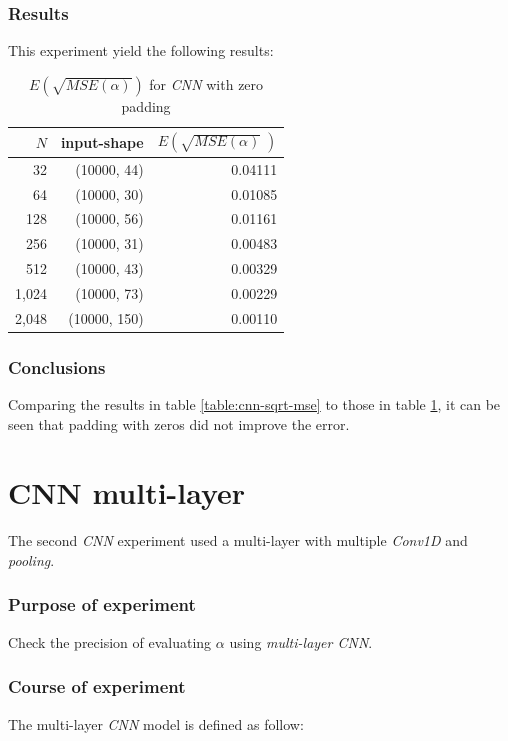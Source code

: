 \documentclass[a4paper, 12pt]{report}
\begin{document}
\subsubsection{Results}
This experiment yield the following results:
\begin{table}[h!]
    \centering
    \begin{tabular}{r r r} 
        $N$ & input-shape & $E\left(\sqrt{MSE(\alpha)}\;\right)$ \\
        \hline
        32 & (10000, 44) & 0.04111 \\ 
        64 & (10000, 30) & 0.01085 \\
        128 & (10000, 56) & 0.01161 \\
        256 & (10000, 31) & 0.00483 \\
        512 & (10000, 43) & 0.00329 \\ 
        1,024 & (10000, 73) & 0.00229 \\ 
        2,048 & (10000, 150) & 0.00110 \\ 
    \end{tabular}
    \caption{$E\left(\sqrt{MSE(\alpha)}\right)$ for \textit{CNN} with zero padding}
    \label{table:cnn-zeros-sqrt-mse}
\end{table}

\subsubsection{Conclusions}
Comparing the results in table \ref{table:cnn-sqrt-mse} to those in table \ref{table:cnn-zeros-sqrt-mse}, it can be seen that padding with zeros did not improve the error. 

\section{CNN multi-layer}
The second \textit{CNN} experiment used a multi-layer with multiple \textit{Conv1D} and \textit{pooling}.

\subsubsection{Purpose of experiment}
Check the precision of evaluating $\alpha$ using \textit{multi-layer CNN}.

\subsubsection{Course of experiment}
The multi-layer \textit{CNN} model is defined as follow:
\end{document}
